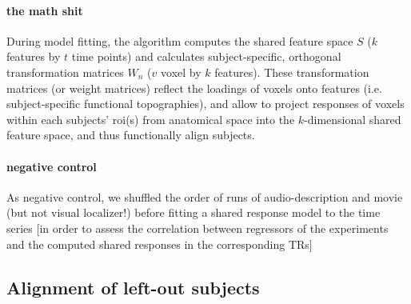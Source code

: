 \paragraph{the math shit}


%
During model fitting, the algorithm computes the shared feature space $S$ ($k$
features by $t$ time points) and calculates subject-specific, orthogonal
transformation matrices $W_{n}$ ($v$ voxel by $k$ features).
%
These transformation matrices (or weight matrices) reflect the loadings of
voxels onto features (i.e. subject-specific functional topographies), and allow
to project responses of voxels within each subjects' \ac{roi}(s) from anatomical
space into the $k$-dimensional shared feature space, and thus functionally align
subjects.


\paragraph{negative control}



As negative control, we shuffled the order of runs of audio-description and
movie (but not visual localizer!) before fitting a shared response model to the
time series [in order to assess the correlation between regressors of the
experiments and the computed shared responses in the corresponding TRs]



\subsection{Alignment of left-out subjects}





